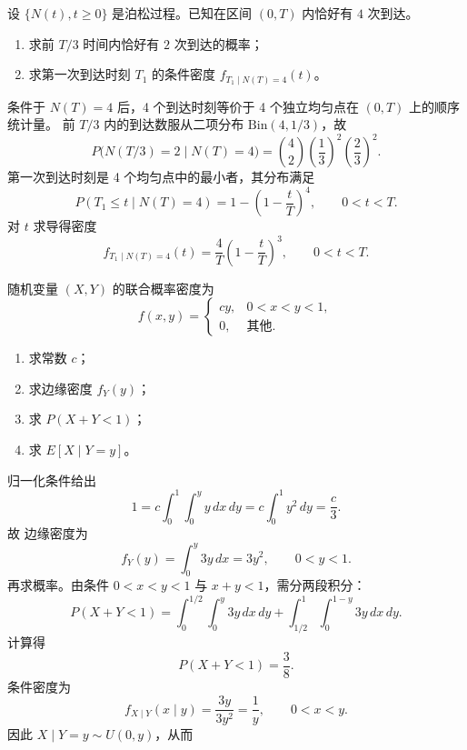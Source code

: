 \begin{question}
设 $\{N(t),t\ge 0\}$ 是泊松过程。已知在区间 $(0,T)$ 内恰好有 $4$ 次到达。
\begin{enumerate}
\item 求前 $T/3$ 时间内恰好有 $2$ 次到达的概率；
\item 求第一次到达时刻 $T_1$ 的条件密度 $f_{T_1\mid N(T)=4}(t)$。
\end{enumerate}
\begin{solution}
条件于 $N(T)=4$ 后，4 个到达时刻等价于 4 个独立均匀点在 $(0,T)$ 上的顺序统计量。
前 $T/3$ 内的到达数服从二项分布 $\mathrm{Bin}(4,1/3)$，故
\[
P\bigl(N(T/3)=2\mid N(T)=4\bigr)=\binom42\left(\frac13\right)^2\left(\frac23\right)^2.
\]
第一次到达时刻是 4 个均匀点中的最小者，其分布满足
\[
P(T_1\leq t\mid N(T)=4)=1-\left(1-\frac{t}{T}\right)^4,
\qquad 0<t<T.
\]
对 $t$ 求导得密度
\[
f_{T_1\mid N(T)=4}(t)=\frac{4}{T}\left(1-\frac{t}{T}\right)^3,
\qquad 0<t<T.
\]
\end{solution}
\end{question}

\begin{question}
随机变量 $(X,Y)$ 的联合概率密度为
\[
f(x,y)=\begin{cases}
cy,&0<x<y<1,\\
0,&\text{其他}.
\end{cases}
\]
\begin{enumerate}
\item 求常数 $c$；
\item 求边缘密度 $f_Y(y)$；
\item 求 $P(X+Y<1)$；
\item 求 $E[X\mid Y=y]$。
\end{enumerate}
\begin{solution}
归一化条件给出
\[
1=c\int_0^1\int_0^y y\,dx\,dy=c\int_0^1 y^2\,dy=\frac{c}{3}.
\]
故
边缘密度为
\[
f_Y(y)=\int_0^y 3y\,dx=3y^2,
\qquad 0<y<1.
\]
再求概率。由条件 $0<x<y<1$ 与 $x+y<1$，需分两段积分：
\[
P(X+Y<1)=\int_0^{1/2}\int_0^y 3y\,dx\,dy+\int_{1/2}^{1}\int_0^{1-y}3y\,dx\,dy.
\]
计算得
\[
P(X+Y<1)=\frac38.
\]
条件密度为
\[
f_{X\mid Y}(x\mid y)=\frac{3y}{3y^2}=\frac1y,
\qquad 0<x<y.
\]
因此 $X\mid Y=y\sim U(0,y)$，从而
\end{solution}
\end{question}

